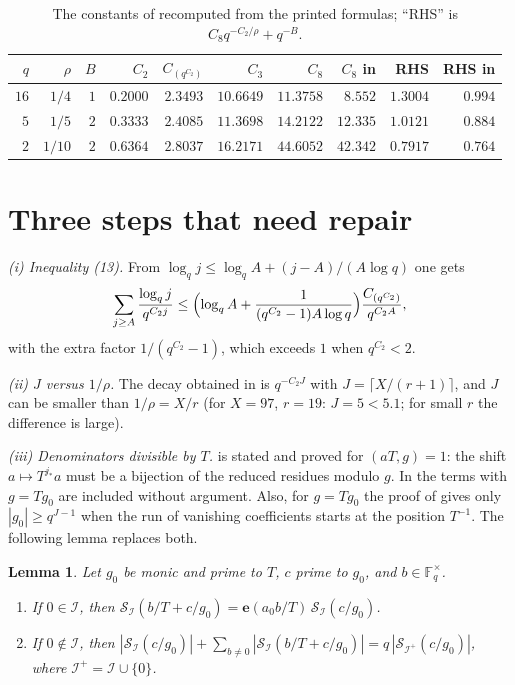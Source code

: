 \documentclass[11pt,a4paper]{amsart}
\newtheorem{lemma}[theorem]{Lemma}
\theoremstyle{remark}
\newcommand{\F}{\mathbb{F}}
\newcommand{\cS}{\mathcal{S}}
\numberwithin{equation}{section}
\begin{document}
\begin{table}[ht]
\centering
\caption{The constants of \cite[\S4]{Ha} recomputed from the printed formulas; ``RHS'' is
$C_8q^{-C_2/\rho}+q^{-B}$.}\label{tab:ha}
\small
\begin{tabular}{@{}rrrrrrrrrr@{}}
\toprule
$q$ & $\rho$ & $B$ & $C_2$ & $C_{(q^{C_2})}$ & $C_3$ & $C_8$ & $C_8$ in \cite{Ha} & RHS & RHS in \cite{Ha}\\
\midrule
$16$ & $1/4$ & $1$ & $0.2000$ & $2.3493$ & $10.6649$ & $11.3758$ & $8.552$ & $1.3004$ & $0.994$\\
$5$ & $1/5$ & $2$ & $0.3333$ & $2.4085$ & $11.3698$ & $14.2122$ & $12.335$ & $1.0121$ & $0.884$\\
$2$ & $1/10$ & $2$ & $0.6364$ & $2.8037$ & $16.2171$ & $44.6052$ & $42.342$ & $0.7917$ & $0.764$\\
\bottomrule
\end{tabular}
\end{table}

\section{Three steps that need repair}\label{sec:repair}
\emph{(i) Inequality \textup{(13)}.} From $\log_qj\le\log_qA+(j-A)/(A\log q)$ one gets
\[
\sum_{j\ge A}\frac{\log_qj}{q^{C_2j}}\le\Bigl(\log_qA+\frac1{(q^{C_2}-1)A\log q}\Bigr)\frac{C_{(q^{C_2})}}{q^{C_2A}},
\]
with the extra factor $1/(q^{C_2}-1)$, which exceeds $1$ when $q^{C_2}<2$.

\emph{(ii) $J$ versus $1/\rho$.} The decay obtained in \cite[\S3]{Ha} is $q^{-C_2J}$ with $J=\lceil X/(r+1)\rceil$,
and $J$ can be smaller than $1/\rho=X/r$ (for $X=97$, $r=19$: $J=5<5.1$; for small $r$ the difference is large).

\emph{(iii) Denominators divisible by $T$.} \cite[Lemma~2.6]{Ha} is stated and proved for $(aT,g)=1$: the shift
$a\mapsto T^{j_*}a$ must be a bijection of the reduced residues modulo $g$. In \cite[(14)]{Ha} the terms with
$g=Tg_0$ are included without argument. Also, for $g=Tg_0$ the proof of \cite[Lemma~2.7]{Ha} gives only
$|g_0|\ge q^{J-1}$ when the run of vanishing coefficients starts at the position $T^{-1}$. The following lemma
replaces both.

\begin{lemma}\label{lem:Tg}
Let $g_0$ be monic and prime to $T$, $c$ prime to $g_0$, and $b\in\F_q^\times$.
\begin{enumerate}
\item[(a)] If $0\in\mathcal I$, then $\cS_{\mathcal I}(b/T+c/g_0)=\mathbf e(a_0b/T)\,\cS_{\mathcal I}(c/g_0)$.
\item[(b)] If $0\notin\mathcal I$, then
$|\cS_{\mathcal I}(c/g_0)|+\sum_{b\ne0}|\cS_{\mathcal I}(b/T+c/g_0)|=q\,|\cS_{\mathcal I^+}(c/g_0)|$,
where $\mathcal I^+=\mathcal I\cup\{0\}$.
\end{enumerate}
\end{lemma}
\end{document}
